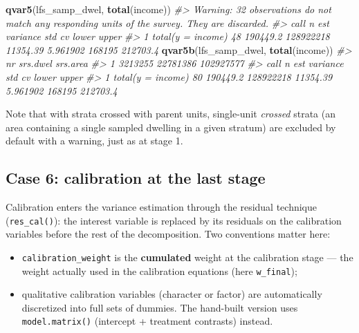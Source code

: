\documentclass[
]{article}
\newenvironment{Shaded}{\begin{snugshade}}{\end{snugshade}}
\newcommand{\CommentTok}[1]{\textcolor[rgb]{0.56,0.35,0.01}{\textit{#1}}}
\newcommand{\FunctionTok}[1]{\textcolor[rgb]{0.13,0.29,0.53}{\textbf{#1}}}
\newcommand{\NormalTok}[1]{#1}
\providecommand{\tightlist}{%
  \setlength{\itemsep}{0pt}\setlength{\parskip}{0pt}}
\begin{document}
\begin{Shaded}
\begin{Highlighting}[]
\FunctionTok{qvar5}\NormalTok{(lfs\_samp\_dwel, }\FunctionTok{total}\NormalTok{(income))}
\CommentTok{\#\textgreater{} Warning: 32 observations do not match any responding units of the survey. They are discarded.}
\CommentTok{\#\textgreater{}                call  n      est  variance      std       cv  lower    upper}
\CommentTok{\#\textgreater{} 1 total(y = income) 48 190449.2 128922218 11354.39 5.961902 168195 212703.4}
\FunctionTok{qvar5b}\NormalTok{(lfs\_samp\_dwel, }\FunctionTok{total}\NormalTok{(income))}
\CommentTok{\#\textgreater{}        nr srs.dwel  srs.area}
\CommentTok{\#\textgreater{} 1 3213255 22781386 102927577}
\CommentTok{\#\textgreater{}                call  n      est  variance      std       cv  lower    upper}
\CommentTok{\#\textgreater{} 1 total(y = income) 80 190449.2 128922218 11354.39 5.961902 168195 212703.4}
\end{Highlighting}
\end{Shaded}

Note that with strata crossed with parent units, single-unit
\emph{crossed} strata (an area containing a single sampled dwelling in a
given stratum) are excluded by default with a warning, just as at stage
1.

\subsection{Case 6: calibration at the last
stage}\label{case-6-calibration-at-the-last-stage}

Calibration enters the variance estimation through the residual
technique (\texttt{res\_cal()}): the interest variable is replaced by
its residuals on the calibration variables before the rest of the
decomposition. Two conventions matter here:

\begin{itemize}
\tightlist
\item
  \texttt{calibration\_weight} is the \textbf{cumulated} weight at the
  calibration stage --- the weight actually used in the calibration
  equations (here \texttt{w\_final});
\item
  qualitative calibration variables (character or factor) are
  automatically discretized into full sets of dummies. The hand-built
  version uses \texttt{model.matrix()} (intercept + treatment contrasts)
  instead.
\end{itemize}
\end{document}
